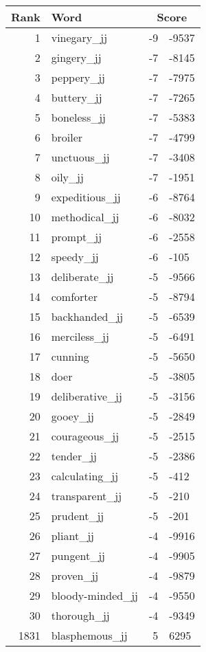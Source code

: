 \begin{longtable}[!htbp]{| rlr@{.}l |}
    \hline
    \textbf{Rank} & \textbf{Word} & \multicolumn{2}{c|}{\textbf{Score}} \\
    \hline
    \endhead
    1 & vinegary\_jj & -9 & -9537 \\
    2 & gingery\_jj & -7 & -8145 \\
    3 & peppery\_jj & -7 & -7975 \\
    4 & buttery\_jj & -7 & -7265 \\
    5 & boneless\_jj & -7 & -5383 \\
    6 & broiler & -7 & -4799 \\
    7 & unctuous\_jj & -7 & -3408 \\
    8 & oily\_jj & -7 & -1951 \\
    9 & expeditious\_jj & -6 & -8764 \\
    10 & methodical\_jj & -6 & -8032 \\
    11 & prompt\_jj & -6 & -2558 \\
    12 & speedy\_jj & -6 & -105 \\
    13 & deliberate\_jj & -5 & -9566 \\
    14 & comforter & -5 & -8794 \\
    15 & backhanded\_jj & -5 & -6539 \\
    16 & merciless\_jj & -5 & -6491 \\
    17 & cunning & -5 & -5650 \\
    18 & doer & -5 & -3805 \\
    19 & deliberative\_jj & -5 & -3156 \\
    20 & gooey\_jj & -5 & -2849 \\
    21 & courageous\_jj & -5 & -2515 \\
    22 & tender\_jj & -5 & -2386 \\
    23 & calculating\_jj & -5 & -412 \\
    24 & transparent\_jj & -5 & -210 \\
    25 & prudent\_jj & -5 & -201 \\
    26 & pliant\_jj & -4 & -9916 \\
    27 & pungent\_jj & -4 & -9905 \\
    28 & proven\_jj & -4 & -9879 \\
    29 & bloody-minded\_jj & -4 & -9550 \\
    30 & thorough\_jj & -4 & -9349 \\
    1831 & blasphemous\_jj & 5 & 6295 \\

\end{longtable}
